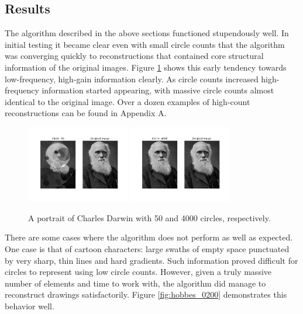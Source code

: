 \documentclass[12pt]{article}
\begin{document}
\subsection{Results}
The algorithm described in the above sections functioned stupendously well. In initial testing it became clear even with small circle counts that the algorithm was converging quickly to reconstructions that contained core structural information of the original images. Figure \ref{fig:darwin_0050} shows this early tendency towards low-frequency, high-gain information clearly. As circle counts increased high-frequency information started appearing, with massive circle counts almost identical to the original image. Over a dozen examples of high-count reconstructions can be found in Appendix A. 
\begin{figure}[H]
\centering
\noindent\includegraphics[width=0.4\textwidth]{../results/darwin/darwin_0050}
\noindent\includegraphics[width=0.4\textwidth]{../results/darwin/darwin_4000}
\caption{A portrait of Charles Darwin with 50 and 4000 circles, respectively. }
\label{fig:darwin_0050}
\end{figure}
There are some cases where the algorithm does not perform as well as expected. One case is that of cartoon characters: large swaths of empty space punctuated by very sharp, thin lines and hard gradients. Such information proved difficult for circles to represent using low circle counts. However, given a truly massive number of elements and time to work with, the algorithm did manage to reconstruct drawings satisfactorily. Figure \ref{fig:hobbes_0200} demonstrates this behavior well. 
\end{document}
